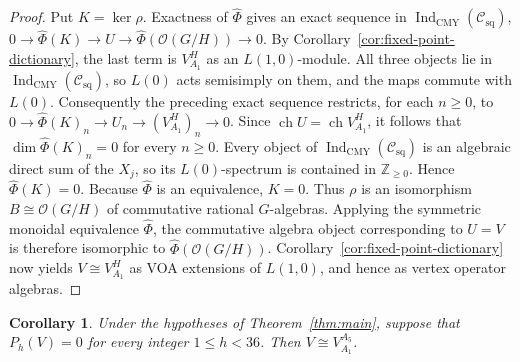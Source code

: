 \documentclass[12pt,leqno]{amsart}
\numberwithin{equation}{section} \newtheorem{thm}{Theorem}[section] \newtheorem{lem}[thm]{Lemma} \newtheorem{ex}[thm]{Example} \newtheorem{prop}[thm]{Proposition} \newtheorem{cor}[thm]{Corollary} \newtheorem{defi}[thm]{Definition} \newtheorem{rmk}[thm]{Remark} \newtheorem{notation}[thm]{Notation}
\newcommand{\ch}{\operatorname{ch}}
\newcommand{\OO}{\mathcal O}
\newcommand{\Csq}{\mathcal C_{\mathrm{sq}}}
\newcommand{\IndCMY}{\operatorname{Ind}_{\mathrm{CMY}}}
\def\Z{\mathbb{Z}} \def\N{\mathbb{N}} \def\A{\mathbb{A}} \def\C{\mathbb{C}} \def\R{\mathbb{R}} \def\Q{\mathbb{Q}} \def\F{\mathbb{F}}
\begin{document}
\begin{proof}
Put \(K=\ker\rho\). Exactness of $\widehat\Phi$ gives an exact sequence in $\IndCMY(\Csq)$, \(0\longrightarrow\widehat\Phi(K)\longrightarrow U \longrightarrow\widehat\Phi(\OO(G/H))\longrightarrow0\). By Corollary~\ref{cor:fixed-point-dictionary}, the last term is $V_{A_1}^{H}$ as an $L(1,0)$-module. All three objects lie in $\IndCMY(\Csq)$, so $L(0)$ acts semisimply on them, and the maps commute with $L(0)$. Consequently the preceding exact sequence restricts, for each $n\ge0$, to \(0\longrightarrow\widehat\Phi(K)_n\longrightarrow U_n \longrightarrow (V_{A_1}^{H})_n\longrightarrow0\). Since \(\ch U=\ch V_{A_1}^{H}\), it follows that \(\dim\widehat\Phi(K)_n=0\) for every $n\ge0$. Every object of $\IndCMY(\Csq)$ is an algebraic direct sum of the $X_j$, so its $L(0)$-spectrum is contained in $\Z_{\ge0}$. Hence \(\widehat\Phi(K)=0\). Because $\widehat\Phi$ is an equivalence, $K=0$. Thus $\rho$ is an isomorphism \(B\cong\OO(G/H)\) of commutative rational $G$-algebras. Applying the symmetric monoidal equivalence $\widehat\Phi$, the commutative algebra object corresponding to $U=V$ is therefore isomorphic to \(\widehat\Phi(\OO(G/H))\). Corollary~\ref{cor:fixed-point-dictionary} now yields \(V\cong V_{A_1}^{H}\) as VOA extensions of $L(1,0)$, and hence as vertex operator algebras.
\end{proof}

\begin{cor}\label{cor:A5-gap}
Under the hypotheses of Theorem~\ref{thm:main}, suppose that $ P_h(V)=0 $ for every integer $1\le h<36$. Then \(V\cong V_{A_1}^{A_5}\).
\end{cor}
\end{document}
